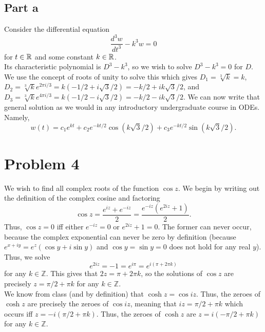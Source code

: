\documentclass{article}
\begin{document}
\subsection{Part a}
Consider the differential equation 
\begin{equation*}
    \frac{d^3w}{dt^3}-k^3w=0 
\end{equation*}
for $t\in\mathbb{R}$ and some constant $k\in\mathbb{R}$.\\
Its characteristic polynomial is $D^3-k^3$, so we wish to solve $D^3-k^3=0$ for $D$. We use the concept of roots of unity to solve this which gives $D_1=\sqrt[3]{k}=k$, $D_2=\sqrt[3]{k}e^{2\pi i/3}=k(-1/2+i\sqrt{3}/2)=-k/2+ik\sqrt{3}/2$, and $D_3=\sqrt[3]{k}e^{4\pi i/3}=k(-1/2-i\sqrt{3}/2)=-k/2-ik\sqrt{3}/2$. We can now write that general solution as we would in any introductory undergraduate course in ODEs. Namely, 
\begin{equation*}
    w(t) = c_1e^{kt}+c_2e^{-kt/2}\cos(k\sqrt{3}/2)+c_3e^{-kt/2}\sin(k\sqrt{3}/2).
\end{equation*}
\section{Problem 4}
We wish to find all complex roots of the function $\cos z$. We begin by writing out the definition of the complex cosine and factoring
\begin{equation*}
    \cos z= \frac{e^{iz}+e^{-iz}}{2}=\frac{e^{-iz}(e^{2iz}+1)}{2}.
\end{equation*}
Thus, $\cos z=0$ iff either $e^{-iz}=0$ or $e^{2iz}+1=0$. The former can never occur, because the complex exponential can never be zero by definition (because $e^{x+iy}=e^z(\cos y+i\sin y)$ and $\cos y=\sin y=0$ does not hold for any real $y$). Thus, we solve
\begin{equation*}
    e^{2iz}=-1=e^{i\pi}=e^{i(\pi+2\pi k)} 
\end{equation*}
for any $k\in\mathbb{Z}$. This gives that $2z=\pi+2\pi k$, so the solutions of $\cos z$ are precisely $z=\pi/2+\pi k$ for any $k\in\mathbb{Z}$.\\
We know from class (and by definition) that $\cosh z=\cos iz$. Thus, the zeroes of $\cosh z$ are precisely the zeroes of $\cos iz$, meaning that $iz=\pi/2+\pi k$ which occurs iff $z=-i(\pi/2+\pi k)$. Thus, the zeroes of $\cosh z$ are $z=i(-\pi/2+\pi k)$ for any $k\in\mathbb{Z}$.
\end{document}
